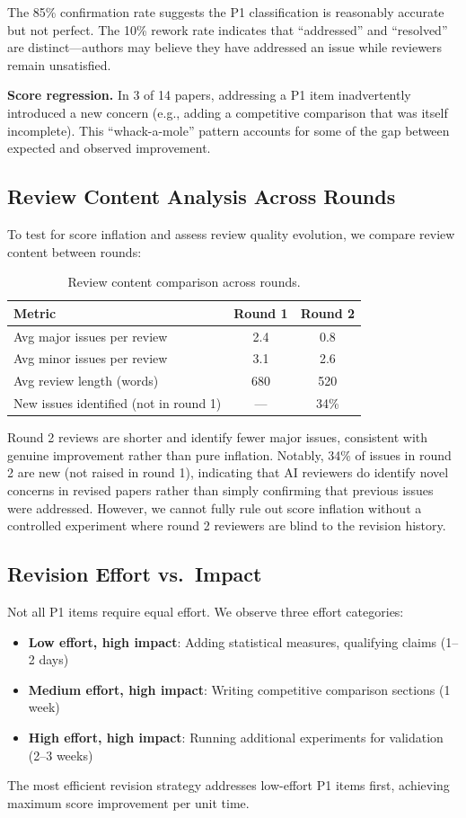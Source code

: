 \noindent The 85\% confirmation rate suggests the P1 classification is reasonably accurate but not perfect. The 10\% rework rate indicates that ``addressed'' and ``resolved'' are distinct---authors may believe they have addressed an issue while reviewers remain unsatisfied.

\textbf{Score regression.} In 3 of 14 papers, addressing a P1 item inadvertently introduced a new concern (e.g., adding a competitive comparison that was itself incomplete). This ``whack-a-mole'' pattern accounts for some of the gap between expected and observed improvement.

\subsection{Review Content Analysis Across Rounds}

To test for score inflation and assess review quality evolution, we compare review content between rounds:

\begin{table}[h]
\centering
\small
\begin{tabular}{lcc}
\toprule
Metric & Round 1 & Round 2 \\
\midrule
Avg major issues per review & 2.4 & 0.8 \\
Avg minor issues per review & 3.1 & 2.6 \\
Avg review length (words) & 680 & 520 \\
New issues identified (not in round 1) & --- & 34\% \\
\bottomrule
\end{tabular}
\caption{Review content comparison across rounds.}
\end{table}

\noindent Round 2 reviews are shorter and identify fewer major issues, consistent with genuine improvement rather than pure inflation. Notably, 34\% of issues in round 2 are new (not raised in round 1), indicating that AI reviewers do identify novel concerns in revised papers rather than simply confirming that previous issues were addressed. However, we cannot fully rule out score inflation without a controlled experiment where round 2 reviewers are blind to the revision history.

\subsection{Revision Effort vs.\ Impact}

Not all P1 items require equal effort. We observe three effort categories:
\begin{itemize}
    \item \textbf{Low effort, high impact}: Adding statistical measures, qualifying claims (1--2 days)
    \item \textbf{Medium effort, high impact}: Writing competitive comparison sections (1 week)
    \item \textbf{High effort, high impact}: Running additional experiments for validation (2--3 weeks)
\end{itemize}

The most efficient revision strategy addresses low-effort P1 items first, achieving maximum score improvement per unit time.
